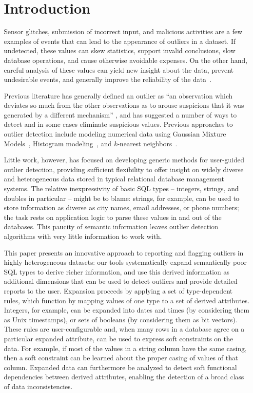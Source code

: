 \section{Introduction}
\label{sec:intro}

Sensor glitches, submission of incorrect input, and malicious activities are a few examples of events that can lead to the appearance of outliers in a dataset. If undetected, these values can skew statistics, support invalid conclusions, slow database operations, and cause otherwise avoidable expenses. On the other hand, careful analysis of these values can yield new insight about the data, prevent undesirable events, and generally improve the reliability of the data~\cite{Achour2014}.

Previous literature has generally defined an outlier as ``an observation which deviates so much from the other observations as to arouse suspicions that it was generated by a different mechanism'' \cite{Hawkins1980}, and has suggested a number of ways to detect and in some cases eliminate suspicious values. Previous approaches to outlier detection include modeling numerical data using Gaussian Mixture Models~\cite{Lu2005,Roberts1994,Roberts1999}, Histogram modeling~\cite{Gebski2007,Sheng2007}, and $k$-nearest neighbors~\cite{Ramaswamy2000}.

Little work, however, has focused on developing generic methods for user-guided outlier detection, providing sufficient flexibility to offer insight on widely diverse and heterogeneous data stored in typical relational database management systems. The relative inexpressivity of basic SQL types -- integers, strings, and doubles in particular -- might be to blame: strings, for example, can be used to store information as diverse as city names, email addresses, or phone numbers; the task rests on application logic to parse these values in and out of the databases. This paucity of semantic information leaves outlier detection algorithms with very little information to work with.

This paper presents an innovative approach to reporting and flagging outliers in highly heterogeneous datasets: our tools systematically expand semantically poor SQL types to derive richer information, and use this derived information as additional dimensions that can be used to detect outliers and provide detailed reports to the user. Expansion proceeds by applying a set of type-dependent rules, which function by mapping values of one type to a set of derived attributes. Integers, for example, can be expanded into dates and times (by considering them as Unix timestamps), or sets of booleans (by considering them as bit vectors). These rules are user-configurable and, when many rows in a database agree on a particular expanded attribute, can be used to express soft constraints on the data. For example, if most of the values in a string column have the same casing, then a soft constraint can be learned about the proper casing of values of that column. Expanded data can furthermore be analyzed to detect soft functional dependencies between derived attributes, enabling the detection of a broad class of data inconsistencies.

